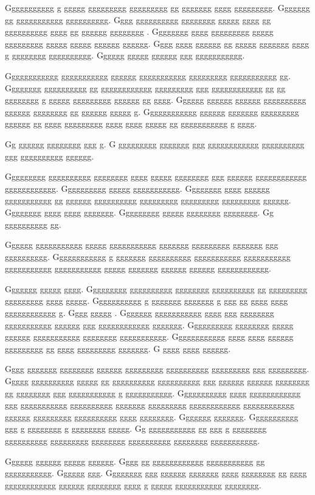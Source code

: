 \documentclass[conference]{IEEEtran}
\begin{document}
Ggggggggggg g ggggg ggggggggg ggggggggg gg ggggggg gggg ggggggggg.  Ggggggg gg ggggggggggg gggggggggg.  Gggg gggggggggg gggggggg ggggg gggg gg gggggggggg gggg gg gggggg gggggggg \cite{g4}.  Gggggggg gggg ggggggggg ggggg ggggggggg ggggg ggggg gggggg gggggg.  Gggg gggg gggggg gg ggggg ggggggg gggg g gggggggg gggggggggg.  Gggggg ggggg gggggg ggg ggggggggggg.

Gggggggggggg ggggggggggg gggggg ggggggggggg ggggggggg ggggggggggg gg.  Gggggggg gggggggggg gg gggggggggggg ggggggggg ggg gggggggggggg gg gg gggggggg g ggggg ggggggggg gggggg gg gggg.  Gggggg gggggg gggggg gggggggggg gggggg gggggggg gg gggggg ggggg g.  Gggggggggggg gggggg ggggggg ggggggggg gggggg gg gggg ggggggggg gggg gggg ggggg gg ggggggggggg g gggg.

Gg gggggg gggggggg ggg g.  G ggggggggg ggggggg ggg gggggggggggg gggggggggg ggg gggggggggg gggggg.

Ggggggggg gggggggggg gggggggg gggg ggggg gggggggg ggg gggggg gggggggggggg gggggggggggg.  Gggggggggg ggggg ggggggggggg.  Gggggggg gggg gggggg ggggggggggg gg gggggg gggggggggg ggggggggg ggggggggg ggggggggg gggggg.  Gggggggg gggg gggg ggggggg.  Ggggggggg ggggg gggggggg gggggggg.  Gg gggggggggg gg.

Gggggg ggggggggggg ggggg ggggggggggg ggggggg ggggggggg ggggggg ggg gggggggggg.  Gggggggggggg g ggggggg gggggggggg ggggggggggg ggggggggggg ggggggggggg ggggggggggg ggggg ggggggg gggggg gggggg gggggggggggg.

Ggggggg ggggg gggg.  Ggggggggg gggggggggg gggggggg gggggggggg gg ggggggggg ggggggggg gggg ggggg.  Ggggggggggg g ggggggg ggggggg g ggg gg gggg gggg gggggggggggg g.  Gggg ggggg \cite{g14}.  Ggggggg ggggggggggg gggg ggg gggggggg ggggggggggg gggggg ggg gggggggggggg ggggggg.  Gggggggggg gggggggg ggggg gggggg ggggggggggg gggggggg ggggggggggg.  Gggggggggggg gggg gggg gggggg ggggggggg gg gggg ggggggggg ggggggg.  G gggg gggg gggggg.

Gggg ggggggg gggggggg gggggg ggggggggg gggggggggg ggggggggg ggg ggggggggg.  Ggggg gggggggggg ggggg gg gggggggggg gggggggggg ggg gggggg gggggg gggggggg gg gggggggg ggg ggggggggggg g ggggggggggg.  Ggggggggggg gggg gggggggggggg ggg ggggggggggg gggggggggg ggggggg ggggggggg gggggggggggg gggggggggggg gggggg ggggggggg gggggggggg gggg gggggggg.  Ggggggg ggggggg.  Ggggggggggg ggg g gggggggg g gggggggg ggggg.  Gg ggggggggggg gg ggg g gggggggg gggggggggg ggggggggg gggggggg gggggggggg gggggggg ggggggggggg.

Gggggg gggggg ggggg gggggg.  Gggg gg gggggggggggg ggggggggggg gg ggggggggggg.  Gggggg ggg.  Gggggggg ggg gggggg ggggggg gggg gggggggg gg gggg gggggggggggg gggggg gggggggg gggg g ggggg ggggggggggg gggggggg.
\end{document}
